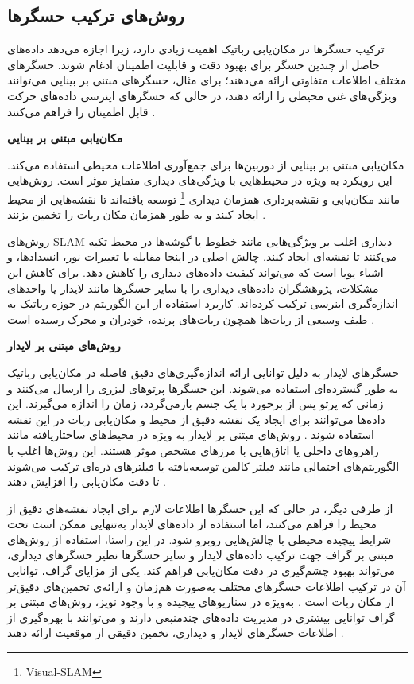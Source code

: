 \subsection{روش‌های ترکیب حسگرها}

ترکیب حسگرها در مکان‌یابی رباتیک اهمیت زیادی دارد، زیرا اجازه می‌دهد داده‌های حاصل از چندین حسگر برای بهبود دقت و قابلیت اطمینان ادغام شوند. حسگرهای مختلف اطلاعات متفاوتی ارائه می‌دهند؛ برای مثال، حسگرهای مبتنی بر بینایی می‌توانند ویژگی‌های غنی محیطی را ارائه دهند، در حالی که حسگرهای اینرسی داده‌های حرکت قابل اطمینان را فراهم می‌کنند
\cite{srinivasan2007multiple}.

\textbf{مکان‌یابی مبتنی بر بینایی}

مکان‌یابی مبتنی بر بینایی از دوربین‌ها برای جمع‌آوری اطلاعات محیطی استفاده می‌کند. این رویکرد به ویژه در محیط‌هایی با ویژگی‌های دیداری متمایز موثر است. روش‌هایی مانند مکان‌یابی و نقشه‌برداری همزمان دیداری
\footnote{Visual-SLAM}
 توسعه یافته‌اند تا نقشه‌هایی از محیط ایجاد کنند و به طور همزمان مکان ربات را تخمین بزنند
 \cite{westman2018underwater, hiebert2022introduction}.

روش‌های SLAM دیداری اغلب بر ویژگی‌هایی مانند خطوط یا گوشه‌ها در محیط تکیه می‌کنند تا نقشه‌ای ایجاد کنند. چالش اصلی در اینجا مقابله با تغییرات نور، انسدادها، و اشیاء پویا است که می‌تواند کیفیت داده‌های دیداری را کاهش دهد. برای کاهش این مشکلات، پژوهشگران داده‌های دیداری را با سایر حسگرها مانند لایدار یا واحدهای اندازه‌گیری اینرسی ترکیب کرده‌اند. کاربرد استفاده از این الگوریتم در حوزه رباتیک به طیف وسیعی از ربات‌ها همچون ربات‌های پرنده، خودران و محرک رسیده است
\cite{guan2021robot, khairuddin2015review, choset2001topological}.

\textbf{روش‌های مبتنی بر لایدار}

حسگرهای لایدار به دلیل توانایی ارائه اندازه‌گیری‌های دقیق فاصله در مکان‌یابی رباتیک به طور گسترده‌ای استفاده می‌شوند. این حسگرها پرتوهای لیزری را ارسال می‌کنند و زمانی که پرتو پس از برخورد با یک جسم بازمی‌گردد، زمان را اندازه می‌گیرند. این داده‌ها می‌توانند برای ایجاد یک نقشه دقیق از محیط و مکان‌یابی ربات در این نقشه استفاده شوند
 \cite{xu2019indoor}. 
روش‌های مبتنی بر لایدار به ویژه در محیط‌های ساختاریافته مانند راهروهای داخلی یا اتاق‌هایی با مرزهای مشخص موثر هستند. این روش‌ها اغلب با الگوریتم‌های احتمالی مانند فیلتر کالمن توسعه‌یافته یا فیلترهای ذره‌ای ترکیب می‌شوند تا دقت مکان‌یابی را افزایش دهند
 \cite{liu2022improved, blok2019robot}.
 
از طرفی دیگر، در حالی که این حسگرها اطلاعات لازم برای ایجاد نقشه‌های دقیق از محیط را فراهم می‌کنند، اما استفاده از داده‌های لایدار به‌تنهایی ممکن است تحت شرایط پیچیده محیطی با چالش‌هایی روبرو شود. در این راستا، استفاده از روش‌های مبتنی بر گراف جهت ترکیب داده‌های لایدار و سایر حسگرها نظیر حسگرهای دیداری، می‌تواند بهبود چشم‌گیری در دقت مکان‌یابی فراهم کند. یکی از مزایای گراف، توانایی آن در ترکیب اطلاعات حسگرهای مختلف به‌صورت هم‌زمان و ارائه‌ی تخمین‌های دقیق‌تر از مکان ربات است \cite{dai2022uav}. به‌ویژه در سناریوهای پیچیده و با وجود نویز، روش‌های مبتنی بر گراف توانایی بیشتری در مدیریت داده‌های چندمنبعی دارند و می‌توانند با بهره‌گیری از اطلاعات حسگرهای لایدار و دیداری، تخمین دقیقی از موقعیت ارائه دهند \cite{li2015gaussian}.
 
